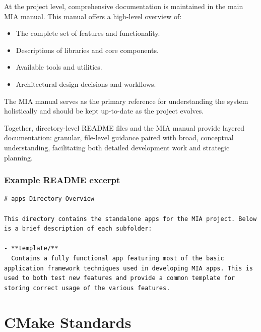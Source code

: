 At the project level, comprehensive documentation is maintained in the main MIA manual. This manual offers a high-level overview of:
\begin{itemize}\itemsep0em
    \item The complete set of features and functionality.
    \item Descriptions of libraries and core components.
    \item Available tools and utilities.
    \item Architectural design decisions and workflows.
\end{itemize}
The MIA manual serves as the primary reference for understanding the system holistically and should be kept up-to-date as the project evolves.

Together, directory-level README files and the MIA manual provide layered documentation: granular, file-level guidance paired with broad, conceptual understanding, facilitating both detailed development work and strategic planning.

\subsubsection*{Example README excerpt}

\begin{lstlisting}[style=cppstyle]
# apps Directory Overview

This directory contains the standalone apps for the MIA project. Below is a brief description of each subfolder:

- **template/**  
  Contains a fully functional app featuring most of the basic application framework techniques used in developing MIA apps. This is used to both test new features and provide a common template for storing correct usage of the various features.
\end{lstlisting}









\section{CMake Standards}

